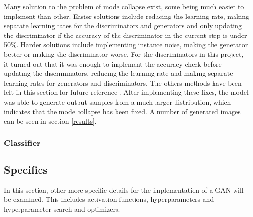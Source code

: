 \documentclass[12pt, fleqn, titlepage]{article}
\begin{document}
Many solution to the problem of mode collapse exist, some being much easier to implement than other. Easier solutions include reducing the learning rate, making separate learning rates for the discriminators and generators and only updating the discriminator if the accuracy of the discriminator in the current step is under 50\%. Harder solutions include implementing instance noise, making the generator better or making the discriminator worse. For the discriminators in this project, it turned out that it was enough to implement the accuracy check before updating the discriminators, reducing the learning rate and making separate learning rates for generators and discriminators. The others methods have been left in this section for future reference \cite{mode_collapse_reddit_fix}\cite{mode_collapse_github}. After implementing these fixes, the model was able to generate output samples from a much larger distribution, which indicates that the mode collapse has been fixed. A number of generated images can be seen in section \ref{results}.

\subsubsection{Classifier}

\subsection{Specifics}\label{model_specifics}
In this section, other more specific details for the implementation of a GAN will be examined. This includes activation functions, hyperparameters and hyperparameter search and optimizers.
\end{document}
